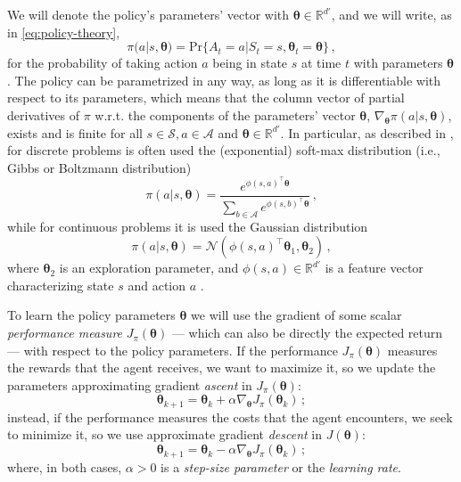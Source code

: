 We will denote the policy's parameters' vector with $\boldsymbol \theta \in \mathbb R^{d'}$, and we will write, as in \eqref{eq:policy-theory},
\begin{equation}
    \pi(a|s,\boldsymbol \theta) = \text{Pr}\{A_t = a | S_t = s, \boldsymbol \theta_t = \boldsymbol {\theta}\} \, ,
    \label{eq:policy-with-parameters}
\end{equation}
for the probability of taking action $a$ being in state $s$ at time $t$ with parameters $\boldsymbol \theta$ \cite{SuttonBarto}. The policy can be parametrized in any way, as long as it is differentiable with respect to its parameters, which means that the column vector of partial derivatives of $\pi$ w.r.t. the components of the parameters' vector $\boldsymbol \theta$, $\nabla_{\boldsymbol \theta} \pi (a|s,\boldsymbol \theta)$, exists and is finite for all $s \in \mathcal S, a \in \mathcal A$ and $\boldsymbol \theta \in \mathbb R^{d'}$. In particular, as described in \cite{Peters2010}, for discrete problems is often used the (exponential) soft-max distribution (i.e., Gibbs or Boltzmann distribution)
\begin{equation}
    \pi(a|s, \boldsymbol \theta) = \frac{e^{\phi(s,a)^\top \boldsymbol \theta}}{\sum_{b \in \mathcal A} e^{\phi(s,b)^\top \boldsymbol \theta}} \, ,
    \label{eq:pi-boltzmann}
\end{equation}
while for continuous problems it is used the Gaussian distribution
\begin{equation}
    \pi(a|s, \boldsymbol \theta) = \mathcal N(\phi(s,a)^\top \boldsymbol \theta_1, \boldsymbol \theta_2) \, ,
\end{equation}
where $\boldsymbol \theta_2$ is an exploration parameter, and $\phi(s,a) \in \mathbb R^{d'}$ is a feature vector characterizing state $s$ and action $a$ \cite{Sutton2000}.

To learn the policy parameters $\boldsymbol \theta$ we will use the  gradient of some scalar \emph{performance measure} $J_\pi(\boldsymbol \theta)$ --- which can also be directly the expected return --- with respect to the policy parameters. If the performance $J_\pi(\boldsymbol \theta)$ measures the rewards that the agent receives, we want to maximize it, so we update the parameters approximating gradient \textit{ascent} in $J_\pi(\boldsymbol \theta)$:
\begin{equation}
    \boldsymbol \theta_{k+1} = \boldsymbol \theta_k + \alpha \nabla_{\boldsymbol \theta} J_\pi(\boldsymbol \theta_k) \, ;
    \label{eq:grad-ascent}
\end{equation}
instead, if the performance measures the costs that the agent encounters, we seek to minimize it, so we use approximate gradient \textit{descent} in $J(\boldsymbol \theta)$:
\begin{equation}
    \boldsymbol \theta_{k+1} = \boldsymbol \theta_k - \alpha \nabla_{\boldsymbol \theta} J_\pi(\boldsymbol \theta_k) \, ;
    \label{eq:grad-descent}
\end{equation}
where, in both cases, $\alpha > 0$ is a \emph{step-size parameter} or the \emph{learning rate}.

